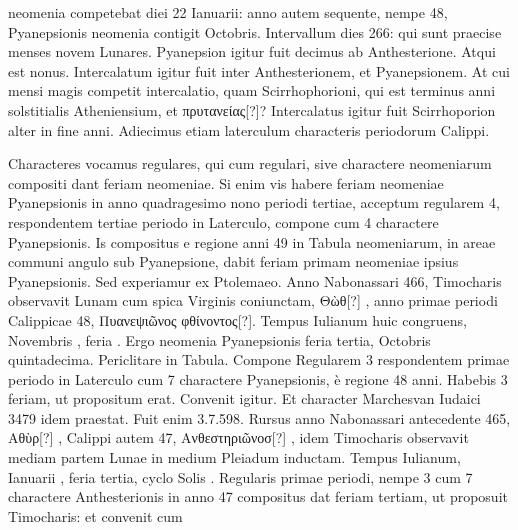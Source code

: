 neomenia competebat diei 22 Ianuarii: anno autem sequente, nempe
48, Pyanepsionis neomenia contigit  Octobris.
Intervallum
dies 266: qui sunt praecise menses novem Lunares.
Pyanepsion igitur
fuit decimus ab Anthesterione.
Atqui est nonus.
Intercalatum
igitur fuit inter Anthesterionem, et Pyanepsionem.
At cui mensi
magis competit intercalatio, quam Scirrhophorioni, qui est terminus
anni solstitialis Atheniensium, et \textgreek{πρυτανείας[?]}?
Intercalatus igitur fuit Scirrhoporion alter in fine anni.
Adiecimus etiam laterculum characteris periodorum
Calippi.
\begin{table}[htbp]
 
\end{table}
%
Characteres vocamus regulares, qui
cum regulari, sive charactere neomeniarum compositi
dant feriam neomeniae.
Si enim vis habere feriam neomeniae
Pyanepsionis in anno quadragesimo nono periodi
tertiae, acceptum regularem 4, respondentem tertiae periodo
in Laterculo, compone cum 4 charactere Pyanepsionis.
Is compositus e regione anni 49 in Tabula
neomeniarum, in areae communi angulo sub Pyanepsione, dabit feriam
primam neomeniae ipsius Pyanepsionis.
%
Sed experiamur ex Ptolemaeo.
Anno Nabonassari 466, Timocharis observavit Lunam cum
spica Virginis coniunctam, \textgreek{Θὼθ[?] },
anno primae periodi Calippicae 48,
\textgreek{Πυανεψιῶνος  φθίνοντος[?]}.
Tempus Iulianum huic congruens, Novembris
, feria .
Ergo neomenia Pyanepsionis feria tertia, Octobris
quintadecima.
Periclitare in Tabula.
Compone Regularem 3
respondentem primae periodo in Laterculo cum 7 charactere Pyanepsionis,
è regione 48 anni.
Habebis 3 feriam, ut propositum erat.
Convenit
igitur.
Et character Marchesvan Iudaici 3479 idem praestat.
Fuit enim 3.7.598.
Rursus anno Nabonassari antecedente 465, \textgreek{Αθὺρ[?]
}, Calippi autem 47, \textgreek{Ανθεστηριῶνοσ[?] },
 idem Timocharis observavit
mediam partem Lunae in medium Pleiadum inductam.
Tempus Iulianum,
Ianuarii , feria tertia, cyclo Solis .
Regularis primae
periodi, nempe 3 cum 7 charactere Anthesterionis in anno 47 compositus
dat feriam tertiam, ut proposuit Timocharis: et convenit cum
